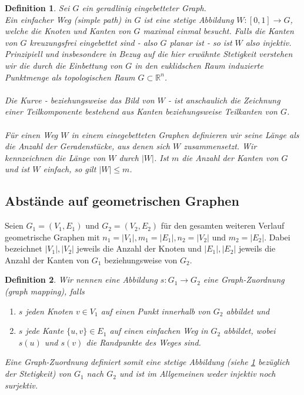 \documentclass[a4paper, 12pt, twoside]{article}
\theoremstyle{Format1} %
\newtheorem{Def}{Definition}[section]       %
\begin{document}
\begin{Def} \label{Definition Einfacher Weg}
	Sei $G$ ein geradlinig eingebetteter Graph.
	\\
	Ein \textit{einfacher Weg (simple path) in $G$} ist eine stetige Abbildung $W: [0,1] \to G$, welche die Knoten und Kanten von $G$ maximal einmal besucht.
	Falls die Kanten von $G$ kreuzungsfrei eingebettet sind - also $G$ planar ist - so ist $W$ also injektiv.
	Prinzipiell und insbesondere in Bezug auf die hier erwähnte \textit{Stetigkeit} verstehen wir die durch die Einbettung von
	$G$ in den euklidschen Raum induzierte Punktmenge als \textit{topologischen Raum} $G \subset \mathbb{R}^n$.
	\\
	\\
	Die Kurve - beziehungsweise das Bild von $W$ - ist anschaulich die Zeichnung einer Teilkomponente bestehend aus
	Kanten beziehungsweise Teilkanten von $G$.
	\\
	\\
	Für einen Weg $W$ in einem einegebetteten Graphen definieren wir seine \textit{Länge} als die Anzahl der Geradenstücke, aus
	denen sich $W$ zusammensetzt. Wir kennzeichnen die Länge von $W$ durch $|W|$. Ist $m$ die Anzahl der Kanten von $G$ und ist $W$ einfach, so gilt
	$|W| \leq m$.
\end{Def}

\subsection{Abstände auf geometrischen Graphen}

Seien $ G_1=(V_1, E_1) $ und $ G_2=(V_2, E_2) $ für den gesamten weiteren Verlauf geometrische Graphen mit
$n_1 = |V_1|, m_1 = |E_1|, n_2 = |V_2|$ und $m_2 = |E_2|$. Dabei bezeichnet $|V_1|, |V_2|$ jeweils die Anzahl der Knoten und $|E_1|,|E_2|$ jeweils die Anzahl der Kanten
von $G_1$ beziehungsweise von $G_2$.

\begin{Def} \label{Definition Graph-Zuordnung}
	Wir nennen eine Abbildung $s: G_1 \to G_2 $ eine \textit{Graph-Zuordnung (graph mapping)}, falls
    	\begin{enumerate}
		\item[1)] $s$ jeden Knoten $ v \in V_1 $ auf einen Punkt innerhalb von $ G_2 $ abbildet und
		\item[2)] $s$ jede Kante $ \{u,v\} \in E_1 $ auf einen einfachen Weg in $G_2$ abbildet, wobei $s(u)$ und $s(v)$ die Randpunkte des Weges sind.
    	\end{enumerate}

	Eine Graph-Zuordnung definiert somit eine stetige Abbildung (siehe \ref{Definition Einfacher Weg} bezüglich der Stetigkeit) von $ G_1 $ nach $ G_2 $
	und ist im Allgemeinen weder injektiv noch surjektiv.
\end{Def}
\end{document}
